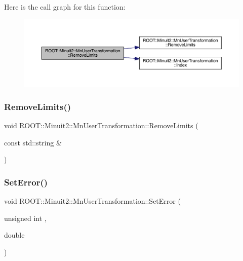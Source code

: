 Here is the call graph for this function\+:
\nopagebreak
\begin{figure}[H]
\begin{center}
\leavevmode
\includegraphics[width=350pt]{d9/d98/classROOT_1_1Minuit2_1_1MnUserTransformation_ae5e9a3037483cfc354b739ef44cd1867_cgraph}
\end{center}
\end{figure}
\mbox{\label{classROOT_1_1Minuit2_1_1MnUserTransformation_ae5e9a3037483cfc354b739ef44cd1867}} 
\subsubsection{\texorpdfstring{RemoveLimits()}{RemoveLimits()}\hspace{0.1cm}{\footnotesize\ttfamily [6/6]}}
{\footnotesize\ttfamily void R\+O\+O\+T\+::\+Minuit2\+::\+Mn\+User\+Transformation\+::\+Remove\+Limits (\begin{DoxyParamCaption}\item[{const std\+::string \&}]{ }\end{DoxyParamCaption})}

\mbox{\label{classROOT_1_1Minuit2_1_1MnUserTransformation_a6256d78c2aafb1142eadc811ee981d79}} 
\subsubsection{\texorpdfstring{SetError()}{SetError()}\hspace{0.1cm}{\footnotesize\ttfamily [1/6]}}
{\footnotesize\ttfamily void R\+O\+O\+T\+::\+Minuit2\+::\+Mn\+User\+Transformation\+::\+Set\+Error (\begin{DoxyParamCaption}\item[{unsigned int}]{,  }\item[{double}]{ }\end{DoxyParamCaption})}

